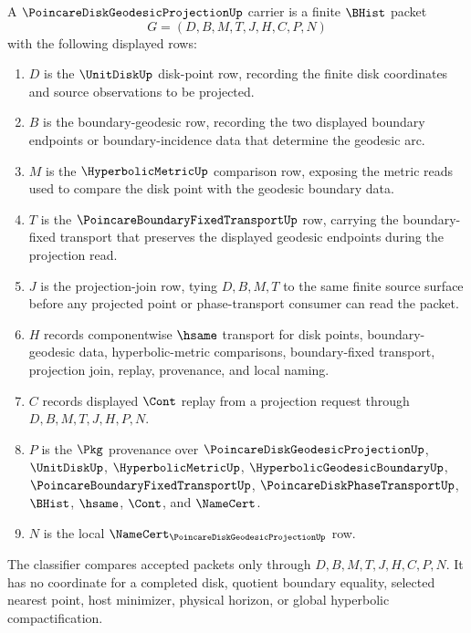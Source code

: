 \begin{definition}
\label{def:poincare-disk-geodesic-projection-carrier}
A $\PoincareDiskGeodesicProjectionUp$ carrier is a finite $\BHist$ packet
$$
G=(D,B,M,T,J,H,C,P,N)
$$
with the following displayed rows:
\begin{enumerate}
\item $D$ is the $\UnitDiskUp$ disk-point row, recording the finite disk coordinates and source observations to be projected.
\item $B$ is the boundary-geodesic row, recording the two displayed boundary endpoints or boundary-incidence data that determine the geodesic arc.
\item $M$ is the $\HyperbolicMetricUp$ comparison row, exposing the metric reads used to compare the disk point with the geodesic boundary data.
\item $T$ is the $\PoincareBoundaryFixedTransportUp$ row, carrying the boundary-fixed transport that preserves the displayed geodesic endpoints during the projection read.
\item $J$ is the projection-join row, tying $D,B,M,T$ to the same finite source surface before any projected point or phase-transport consumer can read the packet.
\item $H$ records componentwise $\hsame$ transport for disk points, boundary-geodesic data, hyperbolic-metric comparisons, boundary-fixed transport, projection join, replay, provenance, and local naming.
\item $C$ records displayed $\Cont$ replay from a projection request through $D,B,M,T,J,H,P,N$.
\item $P$ is the $\Pkg$ provenance over $\PoincareDiskGeodesicProjectionUp$, $\UnitDiskUp$, $\HyperbolicMetricUp$, $\HyperbolicGeodesicBoundaryUp$, $\PoincareBoundaryFixedTransportUp$, $\PoincareDiskPhaseTransportUp$, $\BHist$, $\hsame$, $\Cont$, and $\NameCert$.
\item $N$ is the local $\NameCert_{\PoincareDiskGeodesicProjectionUp}$ row.
\end{enumerate}
The classifier compares accepted packets only through $D,B,M,T,J,H,C,P,N$. It has no coordinate for a completed disk, quotient boundary equality, selected nearest point, host minimizer, physical horizon, or global hyperbolic compactification.
\end{definition}

